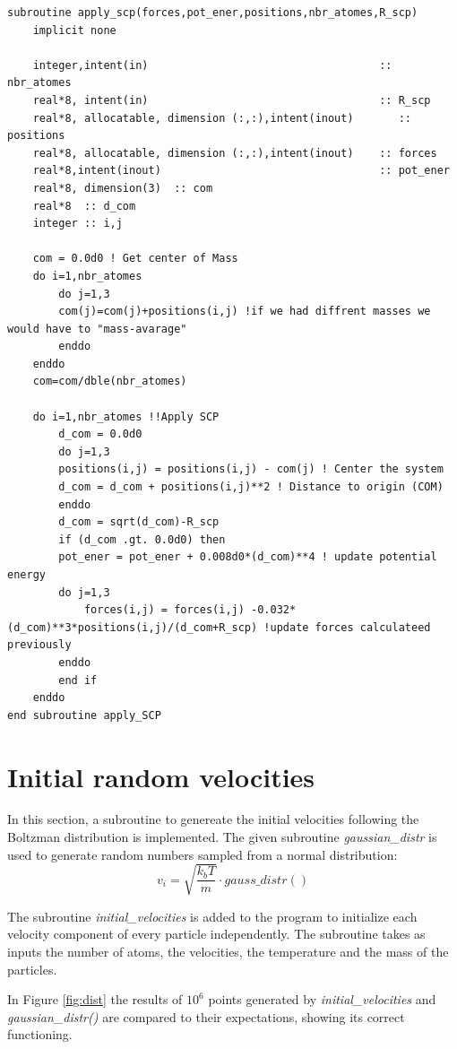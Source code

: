 \documentclass{cis320}
\begin{document}
\begin{lstlisting}[caption=Subroutine to apply a SCP.]
subroutine apply_scp(forces,pot_ener,positions,nbr_atomes,R_scp)
    implicit none
    
    integer,intent(in)                                    :: nbr_atomes
    real*8, intent(in)                                    :: R_scp
    real*8, allocatable, dimension (:,:),intent(inout)       :: positions
    real*8, allocatable, dimension (:,:),intent(inout)    :: forces
    real*8,intent(inout)                                  :: pot_ener
    real*8, dimension(3)  :: com
    real*8  :: d_com
    integer :: i,j
    
    com = 0.0d0 ! Get center of Mass
    do i=1,nbr_atomes
        do j=1,3
        com(j)=com(j)+positions(i,j) !if we had diffrent masses we would have to "mass-avarage"
        enddo
    enddo
    com=com/dble(nbr_atomes) 
    
    do i=1,nbr_atomes !!Apply SCP
        d_com = 0.0d0
        do j=1,3
        positions(i,j) = positions(i,j) - com(j) ! Center the system
        d_com = d_com + positions(i,j)**2 ! Distance to origin (COM)
        enddo
        d_com = sqrt(d_com)-R_scp
        if (d_com .gt. 0.0d0) then
        pot_ener = pot_ener + 0.008d0*(d_com)**4 ! update potential energy
        do j=1,3
            forces(i,j) = forces(i,j) -0.032*(d_com)**3*positions(i,j)/(d_com+R_scp) !update forces calculateed previously
        enddo
        end if
    enddo
end subroutine apply_SCP \end{lstlisting}

\section{Initial random velocities}
In this section, a subroutine to genereate the initial velocities following the Boltzman distribution is implemented. The given subroutine \textit{gaussian\_distr} is used to generate random numbers sampled from a normal distribution:
\[
v_i = \sqrt{\frac{k_b T}{m}}\cdot gauss\_distr()
\]

The subroutine \textit{initial\_velocities} is added to the program to initialize each velocity component of every particle independently. The subroutine takes as inputs the number of atoms, the velocities, the temperature and the mass of the particles.\\
\par
In Figure \ref{fig:dist} the results of $10^{6}$ points generated by \textit{initial\_velocities} and \textit{gaussian\_distr()} are compared to their expectations, showing its correct functioning.\\
\end{document}
